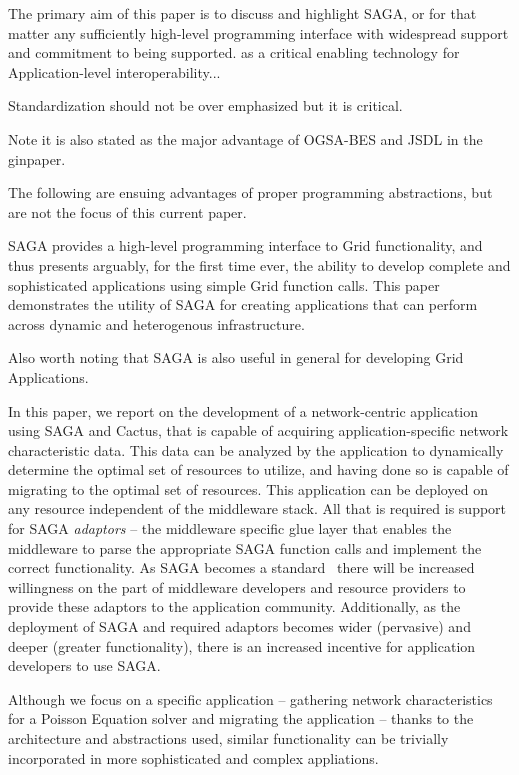 \documentclass[conference,final]{IEEEtran}
\begin{document}
{\noindent The primary aim of this paper is to discuss and highlight
SAGA, or for that matter any sufficiently high-level programming
interface with widespread support and commitment to being supported.
as a critical enabling technology for Application-level
interoperability...

Standardization should not be over emphasized but it is critical.

Note it is also stated as the major advantage of OGSA-BES and JSDL in
the ginpaper.


The following are ensuing advantages of proper programming
abstractions, but are not the focus of this current paper.

 SAGA provides a high-level programming interface to
Grid functionality, and thus presents arguably, for the first time
ever, the ability to develop complete and sophisticated applications
using simple Grid function calls.  This paper demonstrates the utility
of SAGA for creating applications that can perform across dynamic and
heterogenous infrastructure.

Also worth noting that SAGA is also useful in general for developing
Grid Applications.

In this paper, we report on the development of a network-centric
application using SAGA and Cactus, that is capable of acquiring
application-specific network characteristic data. This data can be
analyzed by the application to dynamically determine the optimal set
of resources to utilize, and having done so is capable of migrating to
the optimal set of resources.  This application can be deployed on any
resource independent of the middleware stack. All that is required is
support for SAGA {\it adaptors} -- the middleware specific glue layer
that enables the middleware to parse the appropriate SAGA function
calls and implement the correct functionality.  As SAGA becomes a
standard~\cite{saga-uc, saga-req, saga-core} there will be increased
willingness on the part of middleware developers and resource
providers to provide these adaptors to the application community.
Additionally, as the deployment of SAGA and required adaptors becomes
wider (pervasive) and deeper (greater functionality), there is an
increased incentive for application developers to use SAGA.



Although we focus on a specific application -- gathering network
characteristics for a Poisson Equation solver and migrating the
application -- thanks to the architecture and abstractions used,
similar functionality can be trivially incorporated in more
sophisticated and complex appliations.

}
\end{document}
